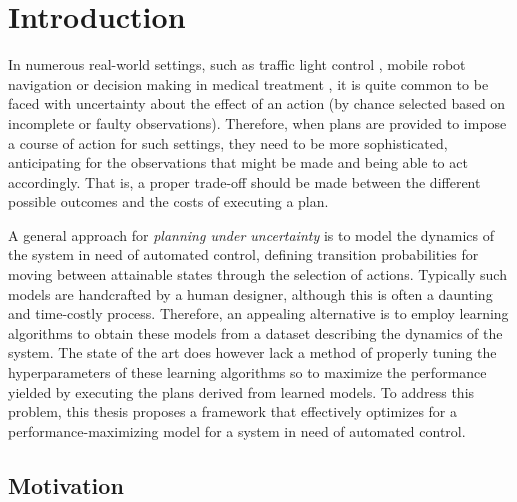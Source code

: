 \chapter{Introduction}
\label{ch:introduction}

In numerous real-world settings, such as traffic light control \cite{wiering2004intelligent}, mobile robot navigation \cite{MartinezCantin2009} or decision making in medical treatment \cite{schaefer2005modeling}, it is quite common to be faced with uncertainty about the effect of an action (by chance selected based on incomplete or faulty observations).
Therefore, when plans are provided to impose a course of action for such settings, they need to be more sophisticated, anticipating for the observations that might be made and being able to act accordingly.
That is, a proper trade-off should be made between the different possible outcomes and the costs of executing a plan.

A general approach for \textit{planning under uncertainty} is to model the dynamics of the system in need of automated control, defining transition probabilities for moving between attainable states through the selection of actions.
Typically such models are handcrafted by a human designer, although this is often a daunting and time-costly process.
Therefore, an appealing alternative is to employ learning algorithms to obtain these models from a dataset describing the dynamics of the system.
The state of the art does however lack a method of properly tuning the hyperparameters of these learning algorithms so to maximize the performance yielded by executing the plans derived from learned models.
To address this problem, this thesis proposes a framework that effectively optimizes for a performance-maximizing model for a system in need of automated control.

\section{Motivation}
\label{sec:motivation}

